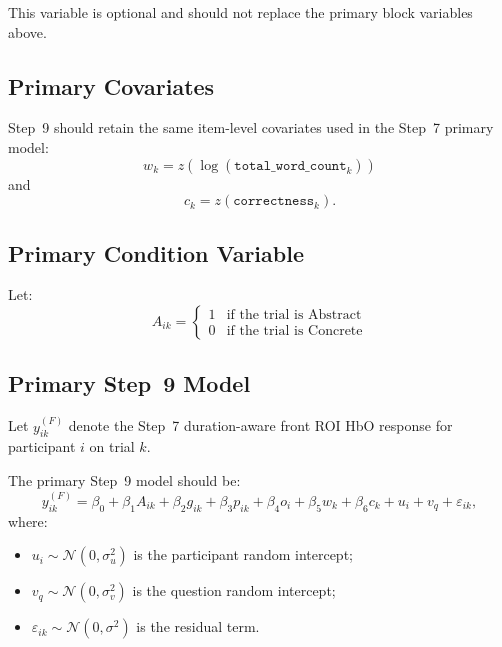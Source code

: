 This variable is optional and should not replace the primary block variables above.

\subsection{Primary Covariates}
Step~9 should retain the same item-level covariates used in the Step~7 primary model:
\begin{equation}
w_k = z\!\left(\log(\texttt{total\_word\_count}_k)\right)
\end{equation}
and
\begin{equation}
c_k = z(\texttt{correctness}_k).
\end{equation}

\subsection{Primary Condition Variable}
Let:
\begin{equation}
A_{ik} =
\begin{cases}
1 & \text{if the trial is Abstract} \\
0 & \text{if the trial is Concrete}
\end{cases}
\end{equation}

\subsection{Primary Step~9 Model}
Let \(y^{(F)}_{ik}\) denote the Step~7 duration-aware front ROI HbO response for participant \(i\)
on trial \(k\).

The primary Step~9 model should be:
\begin{equation}
y^{(F)}_{ik}
=
\beta_0
+
\beta_1 A_{ik}
+
\beta_2 g_{ik}
+
\beta_3 p_{ik}
+
\beta_4 o_i
+
\beta_5 w_k
+
\beta_6 c_k
+
u_i
+
v_q
+
\varepsilon_{ik},
\end{equation}
where:
\begin{itemize}
    \item \(u_i \sim \mathcal{N}(0,\sigma_u^2)\) is the participant random intercept;
    \item \(v_q \sim \mathcal{N}(0,\sigma_v^2)\) is the question random intercept;
    \item \(\varepsilon_{ik} \sim \mathcal{N}(0,\sigma^2)\) is the residual term.
\end{itemize}

